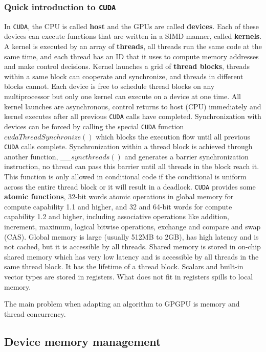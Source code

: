 \documentclass[12pt,journal,compsoc]{IEEEtran}
\begin{document}
\subsubsection{Quick introduction to \texttt{CUDA}}
In \texttt{CUDA}, the CPU is called \textbf{host} and the GPUs are called \textbf{devices}. 
Each of these devices can execute functions that are written in a SIMD manner, called \textbf{kernels}. 
A kernel is executed by an array of \textbf{threads}, all threads run the same code at the same time, and each thread has an ID that it uses to compute memory addresses and make control decisions. 
Kernel launches a grid of \textbf{thread blocks}, threads within a same block can cooperate and synchronize, and threads in different blocks cannot. 
Each device is free to schedule thread blocks on any multiprocessor but only one kernel can execute on a device at one time.
All kernel launches are asynchronous, control returns to host (CPU) immediately and kernel executes after all previous \texttt{CUDA} calls have completed.
Synchronization with devices can be forced by calling the special \texttt{CUDA} function $cudaThreadSynchronize()$ which blocks the execution flow until all previous \texttt{CUDA} calls complete.
Synchronization within a thread block is achieved through another function, \_\_$syncthreads()$ and generates a barrier synchronization instruction, no thread can pass this barrier until all threads in the block reach it.
This function is only allowed in conditional code if the conditional is uniform across the entire thread block or it will result in a deadlock.
\texttt{CUDA} provides some \textbf{atomic functions}, 32-bit words atomic operations in global memory for compute capability 1.1 and higher, and 32 and 64-bit words for compute capability 1.2 and higher, including associative operations like addition, increment, maximum, logical bitwise operations, exchange and compare and swap (CAS).
Global memory is large (usually 512MB to 2GB), has high latency and is not cached, but it is accessible by all threads.
Shared memory is stored in on-chip shared memory which has very low latency and is accessible by all threads in the same thread block.
It has the lifetime of a thread block.
Scalars and built-in vector types are stored in registers. What does not fit in registers spills to local memory.

The main problem when adapting an algorithm to GPGPU is memory and thread concurrency. 

\subsection{Device memory management}
\end{document}
